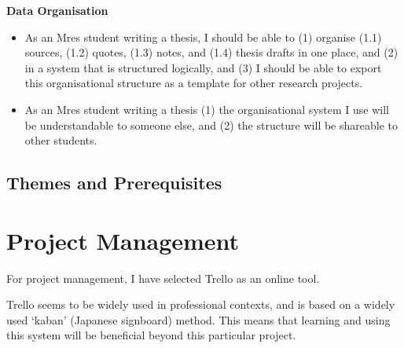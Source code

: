 \documentclass{article}
\begin{document}
\noindent \textbf{Data Organisation}
\begin{itemize}
    \item As an Mres student writing a thesis, I should be able to (1) organise (1.1) sources, (1.2) quotes, (1.3) notes, and (1.4) thesis drafts in one place, and (2) in a system that is structured logically, and (3) I should be able to export this organisational structure as a template for other research projects.
    \item As an Mres student writing a thesis (1) the organisational system I use will be understandable to someone else, and (2) the structure will be shareable to other students.
\end{itemize}


\subsection{Themes and Prerequisites}


\section{Project Management}

For project management, I have selected Trello as an online tool.

Trello seems to be widely used in professional contexts, and is based on a widely used `kaban' (Japanese signboard) method. This means that learning and using this system will be beneficial beyond this particular project.
\end{document}
